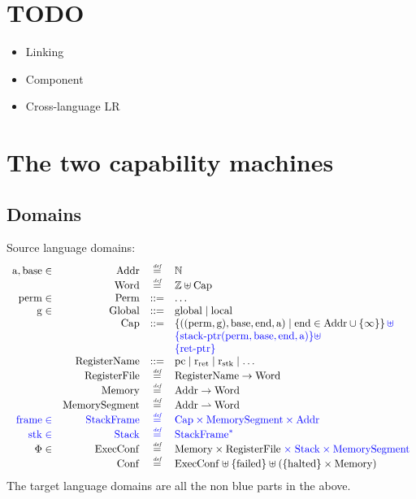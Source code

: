 \documentclass[a4paper]{article}
\newcommand{\defeq}{\stackrel{\textit{\tiny{def}}}{=}}
\newcommand{\defbnf}{::=}
\newcommand{\fun}{\rightarrow}
\newcommand{\parfun}{\rightharpoonup}
\newcommand{\sourcecolor}[1]{\color{blue}}
\newcommand{\nats}{\mathbb{N}}
\newcommand{\ints}{\mathbb{Z}}
\newcommand{\sourcedom}[1]{\mathrm{#1}}
\newcommand{\sRegName}{\sourcedom{RegisterName}}
\newcommand{\sAddr}{\sourcedom{Addr}}
\newcommand{\sPerm}{\sourcedom{Perm}}
\newcommand{\sCap}{\sourcedom{Cap}}
\newcommand{\sWord}{\sourcedom{Word}}
\newcommand{\sMem}{\sourcedom{Memory}}
\newcommand{\sReg}{\sourcedom{RegisterFile}}
\newcommand{\sConf}{\sourcedom{Conf}}
\newcommand{\sExecConf}{\sourcedom{ExecConf}}
\newcommand{\sGlobal}{\sourcedom{Global}}
\newcommand{\sMemSeg}{\sourcedom{MemorySegment}}
\newcommand{\sStkFrame}{\sourcedom{StackFrame}}
\newcommand{\sStack}{\sourcedom{Stack}}
\newcommand{\sstk}{\sourcedom{stk}}
\newcommand{\sstkframe}{\sourcedom{frame}}
\newcommand{\sperm}{\sourcedom{perm}}
\newcommand{\sgl}{\sourcedom{g}}
\newcommand{\sbase}{\sourcedom{base}}
\newcommand{\send}{\sourcedom{end}}
\newcommand{\saddr}{\sourcedom{a}}
\newcommand{\stkptr}[4]{\sourcedom{stack\text{-}ptr}(#1,#2,#3,#4)}
\newcommand{\retptr}{\sourcedom{ret\text{-}ptr}}
\newcommand{\failed}{\mathrm{failed}}
\newcommand{\halted}{\mathrm{halted}}
\newcommand{\pcreg}{\mathrm{pc}}
\newcommand{\rstk}{\mathrm{r}_\mathrm{stk}}
\newcommand{\rO}{\mathrm{r}_\mathrm{ret}}
\newcommand{\plainlocality}[1]{\mathrm{#1}}
\newcommand{\glob}{\plainlocality{global}}
\newcommand{\local}{\plainlocality{local}}
\begin{document}
\section{TODO}
\begin{itemize}
\item Linking
\item Component
\item Cross-language LR
\end{itemize}

\section{The two capability machines}
\subsection{Domains}
Source language domains:
\[
  \begin{array}{rrcl}
   \saddr,\sbase \in & \sAddr & \defeq & \nats \\
    &\sWord & \defeq & \ints \uplus \sCap\\
   \sperm \in& \sPerm & \defbnf & \dots \\
    \sgl \in&\sGlobal & \defbnf & \glob \mid \local \\
    &\sCap &::= & \left\{((\sperm,\sgl),\sbase,\send,\saddr) \mid \send \in \sAddr \cup \{\infty\}\right\} {\sourcecolor{} \uplus}\\
    & & & {\sourcecolor{} \{ \stkptr{\sperm}{\sbase}{\send}{\saddr} \}\uplus}\\ 
    & & & {\sourcecolor{} \{ \retptr \}}\\ 
    &\sRegName & \defbnf &\pcreg \mid \rO \mid \rstk \mid \dots \\
    &\sReg & \defeq & \sRegName \fun \sWord\\
    & \sMem & \defeq & \sAddr \fun \sWord \\
    & \sMemSeg & \defeq & \sAddr \parfun \sWord \\
    {\sourcecolor{} \sstkframe \in} & {\sourcecolor{} \sStkFrame} & {\sourcecolor{} \defeq} & {\sourcecolor{} \sCap \times \sMemSeg \times \sAddr}\\
    {\sourcecolor{} \sstk \in}& {\sourcecolor{} \sStack} & {\sourcecolor{} \defeq} & {\sourcecolor{} \sStkFrame^*} \\
    \Phi \in & \sExecConf & \defeq & \sMem \times \sReg {\sourcecolor{} \; \times \; \sStack \times \sMemSeg }\\
    &\sConf & \defeq & \sExecConf \uplus \{\failed\} \uplus (\{\halted\} \times \sMem)
  \end{array}
\]
The target language domains are all the non blue parts in the above.
\end{document}
